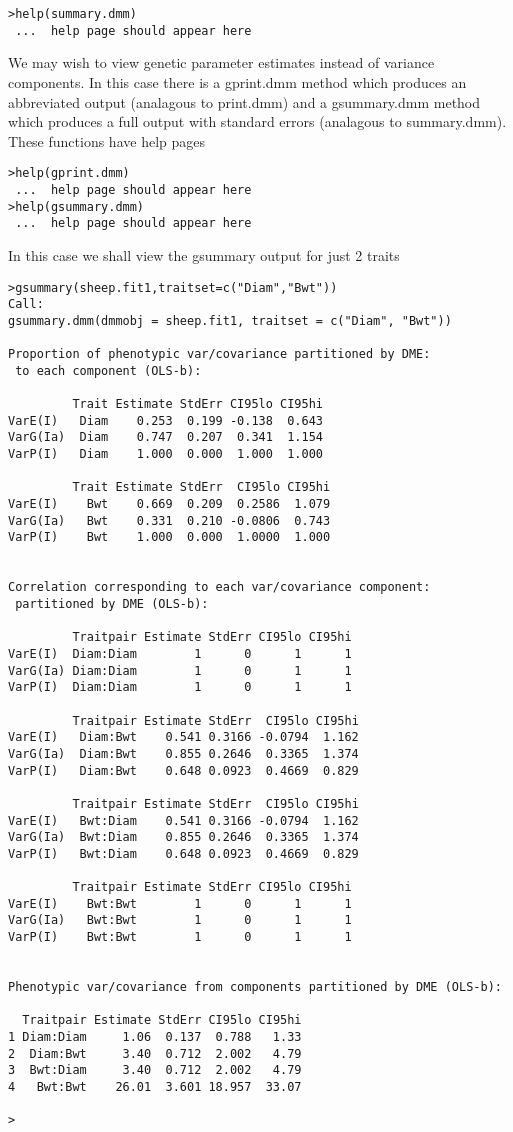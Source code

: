 \documentclass[titlepage]{article}  %
\begin{document}
\begin{verbatim}
>help(summary.dmm)
 ...  help page should appear here
\end{verbatim}

We may wish to view genetic parameter estimates instead of variance components. In this case there is a gprint.dmm method which produces an abbreviated output (analagous to print.dmm) and a gsummary.dmm method which produces a full output  with standard errors (analagous to summary.dmm).
These functions have help pages

\begin{verbatim}
>help(gprint.dmm)
 ...  help page should appear here
>help(gsummary.dmm)
 ...  help page should appear here
\end{verbatim}

 In this case we shall view the gsummary output for just 2 traits

\begin{verbatim}
>gsummary(sheep.fit1,traitset=c("Diam","Bwt"))
Call:
gsummary.dmm(dmmobj = sheep.fit1, traitset = c("Diam", "Bwt"))

Proportion of phenotypic var/covariance partitioned by DME:
 to each component (OLS-b):

         Trait Estimate StdErr CI95lo CI95hi
VarE(I)   Diam    0.253  0.199 -0.138  0.643
VarG(Ia)  Diam    0.747  0.207  0.341  1.154
VarP(I)   Diam    1.000  0.000  1.000  1.000

         Trait Estimate StdErr  CI95lo CI95hi
VarE(I)    Bwt    0.669  0.209  0.2586  1.079
VarG(Ia)   Bwt    0.331  0.210 -0.0806  0.743
VarP(I)    Bwt    1.000  0.000  1.0000  1.000


Correlation corresponding to each var/covariance component:
 partitioned by DME (OLS-b):

         Traitpair Estimate StdErr CI95lo CI95hi
VarE(I)  Diam:Diam        1      0      1      1
VarG(Ia) Diam:Diam        1      0      1      1
VarP(I)  Diam:Diam        1      0      1      1

         Traitpair Estimate StdErr  CI95lo CI95hi
VarE(I)   Diam:Bwt    0.541 0.3166 -0.0794  1.162
VarG(Ia)  Diam:Bwt    0.855 0.2646  0.3365  1.374
VarP(I)   Diam:Bwt    0.648 0.0923  0.4669  0.829

         Traitpair Estimate StdErr  CI95lo CI95hi
VarE(I)   Bwt:Diam    0.541 0.3166 -0.0794  1.162
VarG(Ia)  Bwt:Diam    0.855 0.2646  0.3365  1.374
VarP(I)   Bwt:Diam    0.648 0.0923  0.4669  0.829

         Traitpair Estimate StdErr CI95lo CI95hi
VarE(I)    Bwt:Bwt        1      0      1      1
VarG(Ia)   Bwt:Bwt        1      0      1      1
VarP(I)    Bwt:Bwt        1      0      1      1


Phenotypic var/covariance from components partitioned by DME (OLS-b):

  Traitpair Estimate StdErr CI95lo CI95hi
1 Diam:Diam     1.06  0.137  0.788   1.33
2  Diam:Bwt     3.40  0.712  2.002   4.79
3  Bwt:Diam     3.40  0.712  2.002   4.79
4   Bwt:Bwt    26.01  3.601 18.957  33.07

> 
\end{verbatim}
\end{document}
